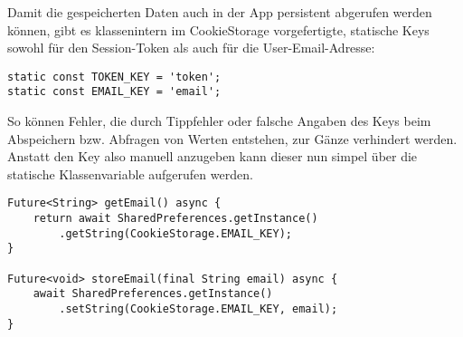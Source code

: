 Damit die gespeicherten Daten auch in der App persistent abgerufen werden können, gibt es klassenintern
im CookieStorage vorgefertigte, statische Keys sowohl für den Session-Token als auch für die User-Email-Adresse:

\begin{lstlisting}
static const TOKEN_KEY = 'token';
static const EMAIL_KEY = 'email';
\end{lstlisting}
\pagebreak
So können Fehler, die durch Tippfehler oder falsche Angaben des Keys beim Abspeichern bzw. Abfragen
von Werten entstehen, zur Gänze verhindert werden.\\
Anstatt den Key also manuell anzugeben kann dieser nun simpel über die statische Klassenvariable
aufgerufen werden.

\begin{lstlisting}
Future<String> getEmail() async {
    return await SharedPreferences.getInstance()
        .getString(CookieStorage.EMAIL_KEY);
}

Future<void> storeEmail(final String email) async {
    await SharedPreferences.getInstance()
        .setString(CookieStorage.EMAIL_KEY, email);
}
\end{lstlisting}






